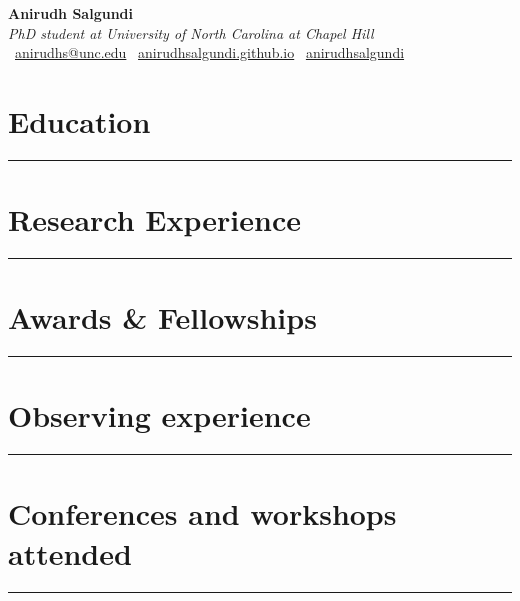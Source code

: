 \documentclass[12pt]{article}
\newcommand{\mytitle}[5]{%
  \begin{center}
    {\Huge\textbf{#1}}\\[0.5em]
    \textit{#2} \\[0.5em]
    \faEnvelope\ \href{mailto:#3}{#3} \quad
    \faGlobe\ \href{https://#4}{#4} \quad
    \faGithub\ \href{https://github.com/#5}{#5}
  \end{center}
}
\begin{document}

\mytitle{Anirudh Salgundi}{PhD student at University of North Carolina at Chapel Hill}{anirudhs@unc.edu}{anirudhsalgundi.github.io}{anirudhsalgundi}
\RaggedRight

\section*{Education}
\vspace{-0.5em}
\noindent\rule{\textwidth}{0.4pt}


\vspace{0.7em}

\section*{Research Experience}
\vspace{-0.5em}
\noindent\rule{\textwidth}{0.4pt}


\vspace{0.7em}

\section*{Awards \& Fellowships}
\vspace{-0.5em}
\noindent\rule{\textwidth}{0.4pt}


\vspace{0.7em}

\section*{Observing experience}
\vspace{-0.5em}
\noindent\rule{\textwidth}{0.4pt}


\vspace{0.7em}

\section*{Conferences and workshops attended}
\vspace{-0.5em}
\noindent\rule{\textwidth}{0.4pt}


\vspace{0.7em}
\end{document}
